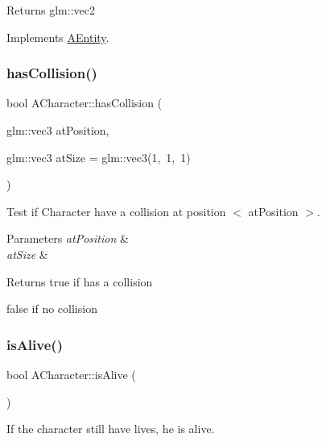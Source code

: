 \begin{DoxyReturn}{Returns}
glm\+::vec2 
\end{DoxyReturn}


Implements \hyperlink{class_a_entity_afbdb591f06debd7e20e0cb98f14717e4}{A\+Entity}.

\mbox{\label{class_a_character_abf19d9677b90cd53bd3191b37939137d}} 
\subsubsection{\texorpdfstring{has\+Collision()}{hasCollision()}}
{\footnotesize\ttfamily bool A\+Character\+::has\+Collision (\begin{DoxyParamCaption}\item[{glm\+::vec3}]{at\+Position,  }\item[{glm\+::vec3}]{at\+Size = {\ttfamily glm\+:\+:vec3(1,~1,~1)} }\end{DoxyParamCaption})}



Test if Character have a collision at position $<$ at\+Position $>$. 


\begin{DoxyParams}{Parameters}
{\em at\+Position} & \\
\hline
{\em at\+Size} & \\
\hline
\end{DoxyParams}
\begin{DoxyReturn}{Returns}
true if has a collision 

false if no collision 
\end{DoxyReturn}
\mbox{\label{class_a_character_a9a1508b5026652e36ebc72972317d576}} 
\subsubsection{\texorpdfstring{is\+Alive()}{isAlive()}}
{\footnotesize\ttfamily bool A\+Character\+::is\+Alive (\begin{DoxyParamCaption}{ }\end{DoxyParamCaption})}



If the character still have lives, he is alive. 

